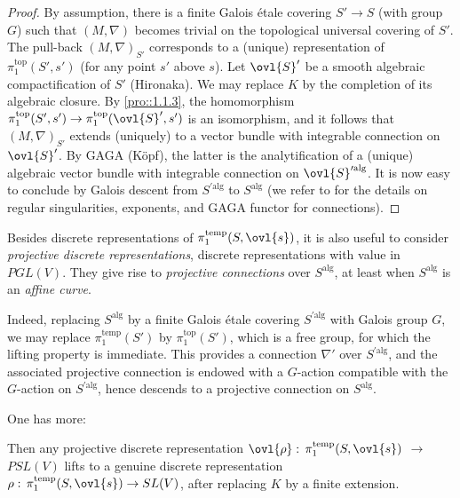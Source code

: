 \begin{proof}
 By assumption, there is a finite Galois \'etale covering $S'\to
 S$ (with group $G$) such that $(M,\nabla)$ becomes 
 trivial on the topological universal covering of $S'$. The pull-back
 $(M,\nabla)_{S'}$ corresponds to a (unique) 
 representation of 
 $\pi_1^{\mathrm{top}}(S', s')$ (for any point $s'$ above $s$). Let
 $\ovl{S}'$ be a smooth algebraic compactification of $S'$ 
 (Hironaka). We may replace $K$ by the completion of its algebraic
 closure. By \ref{pro::1.1.3}, the homomorphism 
 $\pi_1^{\mathrm{top}}(S', s')\to\pi_1^{\mathrm{top}}(\ovl{S}', s')$ is
 an isomorphism, and it follows that $(M,\nabla)_{S'}$ extends 
 (uniquely) to a vector bundle with integrable connection on 
 $\ovl{S}'$. By GAGA (K\"opf), the latter is the analytification of a
 (unique) algebraic vector 
 bundle with integrable connection on $\ovl{S}^{\prime \mathrm{alg}}$. It is
 now easy to conclude by Galois descent from $S^{\prime \mathrm{alg}}$ to 
 $S^{\mathrm{alg}}$ (we refer to 
 \cite{andre01:_de_rham} for the details on regular singularities,
 exponents, and GAGA functor for connections).
\end{proof}

\begin{para}\label{para::3.5.13} Besides discrete representations of
 $\pi_1^{\mathrm{temp}}(S,\ovl{s})$, it is also useful to 
 consider {\it projective discrete representations}, \ie discrete
 representations with value in $PGL(V)$.  They give rise to {\it
 projective connections} over $S^{\mathrm{alg}}$, at least when
 $S^{\mathrm{alg}}$ is an {\it affine curve}. 

 Indeed, replacing $S^{\mathrm{alg}}$ by a finite Galois \'etale
 covering $S^{\prime \mathrm{alg}}$ with Galois group $G$, we may
 replace $\pi_1^{\mathrm{temp}}(S')$ by $\pi_1^{\mathrm{top}}(S')$, 
 which is a free group, for which the lifting property is immediate. This
 provides a connection $\nabla'$ over $S^{\prime \mathrm{alg}}$,
 and the associated projective connection is endowed with a $G$-action
 compatible with the $G$-action on $S^{\prime \mathrm{alg}}$, hence
 descends to a projective connection on $S^{\mathrm{alg}}$.
\end{para}

One has more: 
\begin{pro}\label{pro::3.5.14} Then any projective discrete representation
 $\ovl{\rho}:$ $\pi_1^{\mathrm{temp}}(S,\ovl{s})$ $\to$ $PSL(V)$ lifts to
 a genuine discrete representation
 $\rho:\,\pi_1^{\mathrm{temp}}(S,\ovl{s})\to SL(V)$, after replacing $K$
 by a finite extension.
\end{pro}

